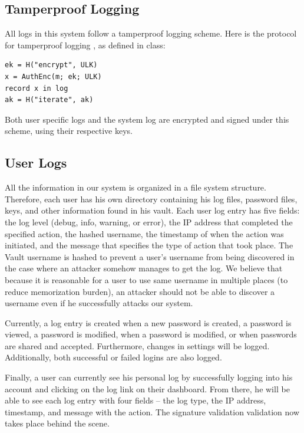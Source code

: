 \documentclass{article}
\begin{document}
\subsection{Tamperproof Logging}
\par All logs in this system follow a tamperproof logging scheme. Here is the protocol for tamperproof logging \cite{bib:TamperProof}, as defined in class:
\begin{lstlisting}[caption={Tamperproof Logging},label={lst:tamperproof_logging},style=Pseudocode]
ek = H("encrypt", ULK)
x = AuthEnc(m; ek; ULK)
record x in log
ak = H("iterate", ak)
\end{lstlisting}
Both user specific logs and the system log are encrypted and signed under this scheme, using their respective keys.

\subsection{User Logs}
\par All the information in our system is organized in a file system structure. Therefore, each user has his own directory containing his log files, password files, keys, and other information found in his vault. Each user log entry has five fields: the log level (debug, info, warning, or error), the IP address that completed the specified action, the hashed username, the timestamp of when the action was initiated, and the message that specifies the type of action that took place. The Vault username is hashed to prevent a user's username from being discovered in the case where an attacker somehow manages to get the log. We believe that because it is reasonable for a user to use same username in multiple places (to reduce memorization burden), an attacker should not be able to discover a username even if he successfully attacks our system.

\par Currently, a log entry is created when a new password is created, a password is viewed, a password is modified, when a password is modified, or when passwords are shared and accepted. Furthermore, changes in settings will be logged. Additionally, both successful or failed logins are also logged.

\par Finally, a user can currently see his personal log by successfully logging into his account and clicking on the log link on their dashboard. From there, he will be able to see each log entry with four fields – the log type, the IP address, timestamp, and message with the action. The signature validation validation now takes place behind the scene.
\end{document}
